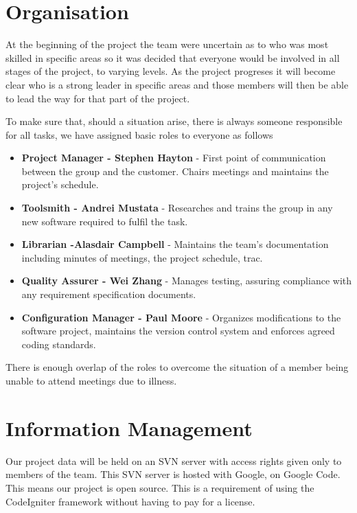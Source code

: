 \documentclass{l3proj}
\begin{document}
\newpage
\section{Organisation}
\label{sect:org}
At the beginning of the project the team were uncertain as to who was most skilled in specific areas so it was decided that everyone would be involved in all stages of the project, to varying levels. As the project progreses it will become clear who is a strong leader in specific areas and those members will then be able to lead the way for that part of the project.

To make sure that, should a situation arise, there is always someone responsible for all tasks, we have assigned basic roles to everyone as follows

\begin{itemize}
\item{\textbf{Project Manager - Stephen Hayton} - First point of communication between the group and the customer. Chairs meetings and maintains the project’s schedule.}
\item{\textbf{Toolsmith - Andrei Mustata} - Researches and trains the group in any new software required to fulfil the task.}
\item{\textbf{Librarian -Alasdair Campbell} - Maintains the team’s documentation including minutes of meetings, the project schedule, trac.}
\item{\textbf{Quality Assurer - Wei Zhang} - Manages testing, assuring compliance with any requirement specification documents.}
\item{\textbf{Configuration Manager - Paul Moore} - Organizes modifications to the software project, maintains the version control system and enforces agreed coding standards.}
\end{itemize}

There is enough overlap of the roles to overcome the situation of a member being unable to attend
meetings due to illness.

\section{Information Management}
\label{sect:info-man}
Our project data will be held on an SVN server with access rights given only to
members of the team. This SVN server is hosted with Google, on Google Code. This
means our project is open source. This is a requirement of using the CodeIgniter
framework without having to pay for a license. 
\end{document}
